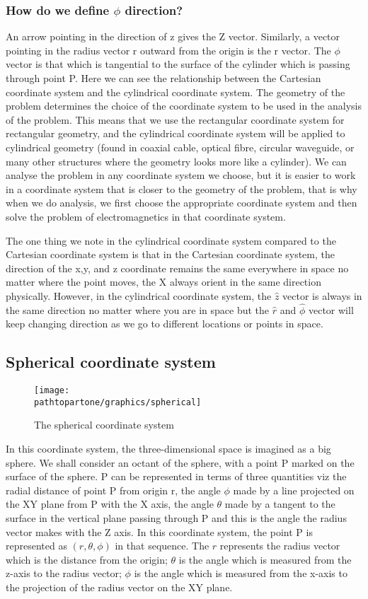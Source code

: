 \subsubsection*{ How do we define $\phi$ direction?} 
An arrow pointing in the direction of z gives the Z vector. Similarly, a vector pointing in the radius vector r outward from the origin is the r vector. The $\phi$ vector is that which is tangential to the surface of the cylinder which is passing through point P. Here we can see the relationship between the Cartesian coordinate system and the cylindrical coordinate system. The geometry of the problem determines the choice of the coordinate system to be used in the analysis of the problem. This means that we use the rectangular coordinate system for rectangular geometry, and the cylindrical coordinate system will be applied to cylindrical geometry (found in coaxial cable, optical fibre, circular waveguide, or many other structures where the geometry looks more like a cylinder).  We can analyse the problem in any coordinate system we choose, but it is easier to work in a coordinate system that is closer to the geometry of the problem, that is why when we do analysis, we first choose the appropriate coordinate system and then solve the problem of electromagnetics in that coordinate system.

The one thing we note in the cylindrical coordinate system compared to the Cartesian coordinate system is that in the Cartesian coordinate system, the direction of the x,y, and z coordinate remains the same everywhere in space no matter where the point moves, the X always orient in the same direction physically. However, in the cylindrical coordinate system, the $\hat{z}$ vector is always in the same direction no matter where you are in space but the $\hat{r}$ and $\hat{\phi}$ vector will keep changing direction as we go to different locations or points in space.

\subsection{Spherical coordinate system}
\begin{figure}[h]
\centering
\texttt{[image: \\pathtopartone/graphics/spherical]}
\caption{The spherical  coordinate system}
\end{figure}

In this coordinate system, the three-dimensional space is imagined as a big sphere. We shall consider an octant of the sphere, with a point P marked on the surface of the sphere. P can be represented in terms of three quantities viz the radial distance of point P from origin r, the angle $\phi$ made by a line projected on the XY plane from P with the X axis, the angle $\theta$ made by a tangent to the surface in the vertical plane passing through P and this is the angle the radius vector makes with the Z axis. In this coordinate system, the point P is represented as $(r,\theta, \phi)$ in that sequence. The $r$ represents the radius vector which is the distance from the origin; $\theta$ is the angle which is measured from the z-axis to the radius vector; $\phi$ is the angle which is measured from the x-axis to the projection of the radius vector on the XY plane.

